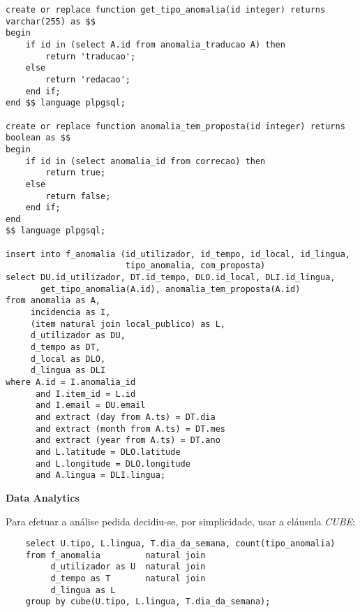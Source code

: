 \documentclass[12pt]{report}
\begin{document}
\begin{verbatim}
create or replace function get_tipo_anomalia(id integer) returns varchar(255) as $$
begin
    if id in (select A.id from anomalia_traducao A) then
        return 'traducao';
    else
        return 'redacao';
    end if;
end $$ language plpgsql;

create or replace function anomalia_tem_proposta(id integer) returns boolean as $$
begin
    if id in (select anomalia_id from correcao) then
        return true;
    else
        return false;
    end if;
end
$$ language plpgsql;

insert into f_anomalia (id_utilizador, id_tempo, id_local, id_lingua,
                        tipo_anomalia, com_proposta)
select DU.id_utilizador, DT.id_tempo, DLO.id_local, DLI.id_lingua,
       get_tipo_anomalia(A.id), anomalia_tem_proposta(A.id)
from anomalia as A,
     incidencia as I,
     (item natural join local_publico) as L,
     d_utilizador as DU,
     d_tempo as DT,
     d_local as DLO,
     d_lingua as DLI
where A.id = I.anomalia_id
      and I.item_id = L.id
      and I.email = DU.email
      and extract (day from A.ts) = DT.dia
      and extract (month from A.ts) = DT.mes
      and extract (year from A.ts) = DT.ano
      and L.latitude = DLO.latitude
      and L.longitude = DLO.longitude
      and A.lingua = DLI.lingua;
    \end{verbatim}


    \Large
    \textbf{Data Analytics}\\
    \normalsize
    \par Para efetuar a análise pedida decidiu-se, por simplicidade, usar a cláusula \textit{CUBE}:
    \footnotesize \begin{verbatim}
    select U.tipo, L.lingua, T.dia_da_semana, count(tipo_anomalia)
    from f_anomalia         natural join
         d_utilizador as U  natural join
         d_tempo as T       natural join
         d_lingua as L
    group by cube(U.tipo, L.lingua, T.dia_da_semana);
    \end{verbatim}\normalsize
\end{document}
